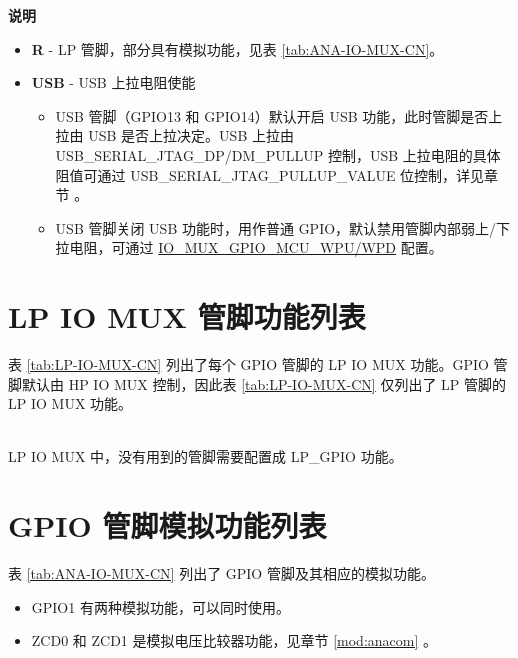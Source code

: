 \documentclass[main\_\_CN.tex]{subfiles}
\begin{document}
\textbf{说明}

\begin{itemize}
\item \textbf{R} - LP 管脚，部分具有模拟功能，见表 \ref{tab:ANA-IO-MUX-CN}。
\item \textbf{USB} - USB 上拉电阻使能            
\begin{itemize}
    \item USB 管脚（GPIO13 和 GPIO14）默认开启 USB 功能，此时管脚是否上拉由 USB 是否上拉决定。USB 上拉由 USB\_SERIAL\_JTAG\_DP/DM\_PULLUP 控制，USB 上拉电阻的具体阻值可通过 USB\_SERIAL\_JTAG\_PULLUP\_VALUE 位控制，详见章节 。
    \item USB 管脚关闭 USB 功能时，用作普通 GPIO，默认禁用管脚内部弱上/下拉电阻，可通过 \hyperref[fielddesc:IOMUXGPIONMCUWPU]{IO\_MUX\_GPIO\_MCU\_WPU/WPD} 配置。
\end{itemize}
\end{itemize}

\section{LP IO MUX 管脚功能列表}

表 \ref{tab:LP-IO-MUX-CN} 列出了每个 GPIO 管脚的 LP IO MUX 功能。GPIO 管脚默认由 HP IO MUX 控制，因此表 \ref{tab:LP-IO-MUX-CN} 仅列出了 LP 管脚的 LP IO MUX 功能。


\tableheaderLPFunctionsCN
\tablecontentLPFunctions

\begin{importantlisting}\\
    LP IO MUX 中，没有用到的管脚需要配置成 LP\_GPIO 功能。
\end{importantlisting}

\section{GPIO 管脚模拟功能列表}

表 \ref{tab:ANA-IO-MUX-CN} 列出了 GPIO 管脚及其相应的模拟功能。


\tableheaderAnalogFunctionsCN
\tablecontentAnalogFunctions
\begin{tiplisting}
\vspace{-2em}
    \begin{itemize}
        \item GPIO1 有两种模拟功能，可以同时使用。
        \item ZCD0 和 ZCD1 是模拟电压比较器功能，见章节 \ref{mod:anacom} \textit{}。
    \end{itemize}
\end{tiplisting}
\end{document}

